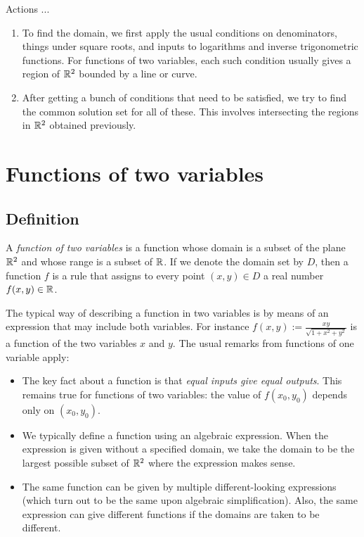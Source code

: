 \documentclass[10pt]{amsart}
\begin{document}
Actions ...

\begin{enumerate}
\item To find the domain, we first apply the usual conditions on
  denominators, things under square roots, and inputs to logarithms
  and inverse trigonometric functions. For functions of two variables,
  each such condition usually gives a region of $\mathbb{R}^2$ bounded by a
  line or curve.
\item After getting a bunch of conditions that need to be satisfied,
  we try to find the common solution set for all of these. This
  involves intersecting the regions in $\mathbb{R}^2$ obtained previously.
\end{enumerate}

\section{Functions of two variables}

\subsection{Definition}

A {\em function of two variables} is a function whose domain is a
subset of the plane $\mathbb{R}^2$ and whose range is a subset of $\mathbb{R}$. If we
denote the domain set by $D$, then a function $f$ is a rule that assigns
to every point $(x,y) \in D$ a real number $f(x,y) \in \mathbb{R}$.

The typical way of describing a function in two variables is by means
of an expression that may include both variables. For instance $f(x,y)
:= \frac{xy}{\sqrt{1 + x^2 + y^2}}$ is a function of the two variables
$x$ and $y$. The usual remarks from functions of one variable apply:

\begin{itemize}
\item The key fact about a function is that {\em equal inputs give
  equal outputs}. This remains true for functions of two variables:
  the value of $f(x_0,y_0)$ depends only on $(x_0,y_0)$.
\item We typically define a function using an algebraic
  expression. When the expression is given without a specified domain,
  we take the domain to be the largest possible subset of $\mathbb{R}^2$ where
  the expression makes sense.
\item The same function can be given by multiple different-looking
  expressions (which turn out to be the same upon algebraic
  simplification). Also, the same expression can give different
  functions if the domains are taken to be different.
\end{itemize}
\end{document}
